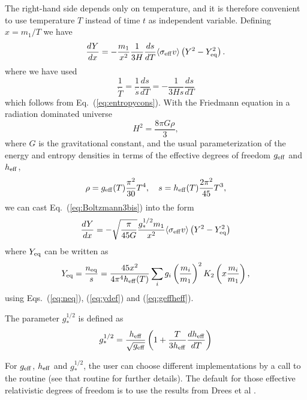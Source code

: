 The right-hand side depends only on temperature, and it is therefore
convenient to use temperature $T$ instead of time $t$ as independent
variable. Defining $x=m_1/T$ we have
\begin{equation}
  \frac{dY}{dx} = - \frac{m_{1}}{x^2} \frac{1}{3H} \frac{ds}{dT}
  \langle \sigma_{\rm{eff}} v \rangle \left( Y^2 -
  Y_{\rm{eq}}^2 \right).
\label{eq:Boltzmann3bis}
\end{equation}
where we have used
\begin{equation}
  \frac{1}{\dot{T}} = \frac{1}{\dot{s}} \frac{ds}{dT} = -
  \frac{1}{3Hs} \frac{ds}{dT} 
\end{equation} 
which follows from Eq.~(\ref{eq:entropycons}). 
With the Friedmann equation in a radiation dominated universe
\begin{equation}
  H^2 = \frac{8\pi G \rho}{3} ,
\end{equation}
where $G$ is the gravitational constant, and the
usual parameterization of the energy and entropy densities
in terms of the effective degrees of freedom $g_{\rm{eff}}$ and
$h_{\rm{eff}}$, \begin{equation} \label{eq:geffheff}
  \rho = g_{\rm{eff}}(T) \frac{\pi^2}{30} T^4
  , \quad 
  s = h_{\rm{eff}}(T) \frac{2\pi^2}{45} T^3 ,
\end{equation}
we can cast Eq.~(\ref{eq:Boltzmann3bis})
into the form \cite{Gondolo:1990dk}
\begin{equation} \label{eq:Boltzmann4}
  \frac{dY}{dx} = - \sqrt{\frac{\pi}{45G}} \frac{g_{*}^{1/2}m_1}{x^2}
  \langle \sigma_{\rm{eff}} v \rangle \left( Y^2 -
  Y_{\rm{eq}}^2 \right) 
\end{equation}
where $Y_{\rm eq}$ can be written as
\begin{equation}
  Y_{\rm{eq}} = \frac{n_{\rm{eq}}}{s} = 
  \frac{45 x^2}{4 \pi^4 h_{\rm{eff}}(T)} \sum_i g_i
  \left( \frac{m_i}{m_1} \right)^2 K_{2} \left( x 
\frac{m_{i}}{m_1}\right),
\end{equation}
using Eqs.~(\ref{eq:neq}), (\ref{eq:ydef}) and
(\ref{eq:geffheff}).

The parameter $g_{*}^{1/2}$ is defined as
\begin{equation}
  g_{*}^{1/2} = \frac{h_{\rm{eff}}}{\sqrt{g_{\rm{eff}}}}
  \left( 1+\frac{T}{3h_{\rm{eff}}} \frac{d h_{\rm{eff}}}{dT}
  \right)
\end{equation}

For $g_{\rm eff}$, $h_{\rm eff}$ and $g_*^{1/2}$, the user can choose different implementations by a call to 
the routine  (see that routine for further details). The default for those effective relativistic 
degrees of freedom is to use the results from Drees et al \cite{Drees:2015exa}.

